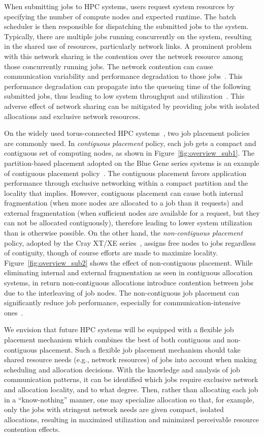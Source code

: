 When submitting jobs to HPC systems, 
users request system resources by specifying the number of compute nodes and expected runtime. 
The batch scheduler is then responsible for dispatching the submitted jobs to the system. 
Typically, there are multiple jobs running concurrently on the system,
resulting in the shared use of resources, particularly network links. 
A prominent problem with this network sharing is the contention over
the network resource among those concurrently running jobs. 
The network contention can cause communication variability and 
performance degradation to those jobs~\cite{abhinav-sc13}. 
This performance degradation can propagate into the queueing time of the following submitted jobs, 
thus leading to low system throughput and utilization~\cite{jose-ipdps15}. 
This adverse effect of network sharing can be mitigated by 
providing jobs with isolated allocations and exclusive network resources.

On the widely used torus-connected HPC systems~\cite{bgq,tofu,titan}, 
two job placement policies are commonly used. 
In \emph{contiguous placement} policy, 
each job gets a compact and contiguous set of computing nodes, 
as shown in Figure~\ref{fig:overview_sub1}. 
The partition-based placement adopted on the Blue Gene 
series systems is an example of contiguous placement policy~\cite{bgloverview}. 
The contiguous placement favors application performance 
through exclusive networking within a compact partition 
and the locality that implies. 
However, contiguous placement can cause both internal fragmentation 
(when more nodes are allocated to a job than it requests) 
and external fragmentation 
(when sufficient nodes are available for a request, but they can not be allocated contiguously), 
therefore leading to lower system utilization than is otherwise possible. 
On the other hand, the \emph{non-contiguous placement} policy, 
adopted by the Cray XT/XE series~\cite{carl-cug}, 
assigns free nodes to jobs regardless of contiguity, 
though of course efforts are made to maximize locality. 
Figure~\ref{fig:overview_sub2} shows the effect of non-contiguous placement. 
While eliminating internal and external fragmentation as seen in contiguous allocation systems, 
in return non-contiguous allocations introduce contention between jobs due to the interleaving of job nodes. 
The non-contiguous job placement can significantly reduce job performance, 
especially for communication-intensive ones~\cite{abhinav-sc13}.

We envision that future HPC systems will be equipped with 
a flexible job placement mechanism which combines the 
best of both contiguous and non-contiguous placement. 
Such a flexible job placement mechanism should take 
shared resource needs (e.g., network resources) of jobs into account 
when making scheduling and allocation decisions. 
With the knowledge and analysis of job communication patterns, 
it can be identified which jobs require exclusive network and allocation locality, and to what degree. 
Then, rather than allocating each job in a ``know-nothing'' manner, 
one may specialize allocation so that, for example, 
only the jobs with stringent network needs are given compact, isolated allocations, 
resulting in maximized utilization and minimized perceivable resource contention effects.

